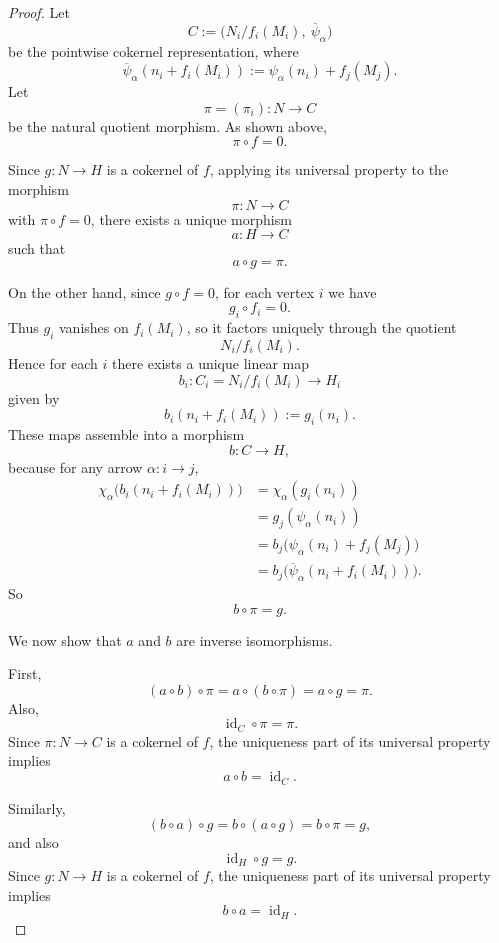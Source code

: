 \documentclass[11pt, a4paper]{article}
\begin{document}
\begin{enumerate}[leftmargin=*, label=\textbf{\arabic*.}]
\begin{proof}
        Let
        \[
        C:=\bigl(N_i/f_i(M_i),\ \overline{\psi}_\alpha\bigr)
        \]
        be the pointwise cokernel representation, where
        \[
        \overline{\psi}_\alpha(n_i+f_i(M_i))
        :=\psi_\alpha(n_i)+f_j(M_j).
        \]
        Let
        \[
        \pi=(\pi_i):N\to C
        \]
        be the natural quotient morphism. As shown above,
        \[
        \pi\circ f=0.
        \]
        
        Since $g:N\to H$ is a cokernel of $f$, applying its universal property to the morphism
        \[
        \pi:N\to C
        \]
        with $\pi\circ f=0$, there exists a unique morphism
        \[
        a:H\to C
        \]
        such that
        \[
        a\circ g=\pi.
        \]
        
        On the other hand, since $g\circ f=0$, for each vertex $i$ we have
        \[
        g_i\circ f_i=0.
        \]
        Thus $g_i$ vanishes on $f_i(M_i)$, so it factors uniquely through the quotient
        \[
        N_i/f_i(M_i).
        \]
        Hence for each $i$ there exists a unique linear map
        \[
        b_i:C_i=N_i/f_i(M_i)\to H_i
        \]
        given by
        \[
        b_i(n_i+f_i(M_i)):=g_i(n_i).
        \]
        These maps assemble into a morphism
        \[
        b:C\to H,
        \]
        because for any arrow $\alpha:i\to j$,
        \begin{align*}
        \chi_\alpha\bigl(b_i(n_i+f_i(M_i))\bigr)
        &=\chi_\alpha(g_i(n_i))\\
        &=g_j(\psi_\alpha(n_i))\\
        &=b_j\bigl(\psi_\alpha(n_i)+f_j(M_j)\bigr)\\
        &=b_j\bigl(\overline{\psi}_\alpha(n_i+f_i(M_i))\bigr).
        \end{align*}
        So
        \[
        b\circ \pi=g.
        \]
        
        We now show that $a$ and $b$ are inverse isomorphisms.
        
        First,
        \[
        (a\circ b)\circ \pi
        =a\circ (b\circ \pi)
        =a\circ g
        =\pi.
        \]
        Also,
        \[
        \operatorname{id}_C\circ \pi=\pi.
        \]
        Since $\pi:N\to C$ is a cokernel of $f$, the uniqueness part of its universal property implies
        \[
        a\circ b=\operatorname{id}_C.
        \]
        
        Similarly,
        \[
        (b\circ a)\circ g
        =b\circ (a\circ g)
        =b\circ \pi
        =g,
        \]
        and also
        \[
        \operatorname{id}_H\circ g=g.
        \]
        Since $g:N\to H$ is a cokernel of $f$, the uniqueness part of its universal property implies
        \[
        b\circ a=\operatorname{id}_H.
        \]
        

\end{proof}
\end{enumerate}
\end{document}
